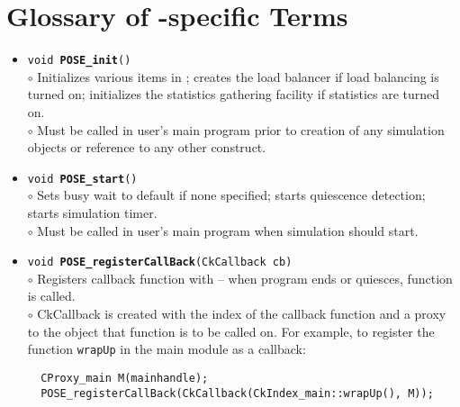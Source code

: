 \section{Glossary of \pose{}-specific Terms}

\begin{itemize}
\item {\tt void {\bf POSE\_init}()}\\
	$\circ$ Initializes various items in \pose{}; creates the load balancer
	if load balancing is turned on; initializes the statistics
	gathering facility if statistics are turned on.\\
	$\circ$ Must be called in user's main program prior to creation of any
	simulation objects or reference to any other \pose{} construct.
\item {\tt void {\bf POSE\_start}()}\\
	$\circ$ Sets busy wait to default if none specified; starts
	quiescence detection; starts simulation timer.\\
	$\circ$ Must be called in user's main program when simulation
	should start.
\item {\tt void {\bf POSE\_registerCallBack}(CkCallback cb)}\\
	$\circ$ Registers callback function with \pose{} -- when program
	ends or quiesces, function is called.\\
	$\circ$ CkCallback is created with the index of the callback
	function and a proxy to the object that function is to be
	called on.  For example, to register the function {\tt wrapUp}
	in the main module as a callback:

\begin{verbatim}
  CProxy_main M(mainhandle);
  POSE_registerCallBack(CkCallback(CkIndex_main::wrapUp(), M));
\end{verbatim}


\end{itemize}

